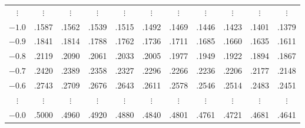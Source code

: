 \documentclass[
  ignorenonframetext,
]{beamer}
\begin{document}
\begin{frame}{}
{{\begin{tabular}{@{}c|cccccccccc@{}}
$\vdots$&$\vdots$&$\vdots$&$\vdots$&$\vdots$&$\vdots$&$\vdots$&$\vdots$&$\vdots$&$\vdots$&$\vdots$\\
$-1.0$& .1587 & .1562 & .1539 & .1515 & .1492 & .1469 & .1446 & .1423 & .1401 & .1379\\%
$-0.9$& .1841 & .1814 & .1788 & .1762 & .1736 & .1711 & .1685 & .1660 & .1635 & .1611\\
$-0.8$& .2119 & .2090 & .2061 & .2033 & .2005 & .1977 & .1949 & .1922 & .1894 & .1867\\
$-0.7$& .2420 & .2389 & .2358 & .2327 & .2296 & .2266 & .2236 & .2206 & .2177 & .2148\\
$-0.6$& .2743 & .2709 & .2676 & .2643 & .2611 & .2578 & .2546 & .2514 & .2483 & .2451\\
$\vdots$&$\vdots$&$\vdots$&$\vdots$&$\vdots$&$\vdots$&$\vdots$&$\vdots$&$\vdots$&$\vdots$&$\vdots$\\
$-0.0$& .5000 & .4960 & .4920 & .4880 & .4840 & .4801 & .4761 & .4721 & .4681 & .4641\\\hline

\end{tabular}}}
\end{frame}
\end{document}
